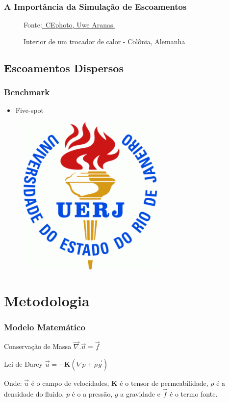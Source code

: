 \documentclass{beamer}
\newcommand{\figcopyright}[4]
{
  \begin{figure}
    \stackunder{
      \texttt{[image: \#1]}
    } {\raggedleft \tiny Fonte:\href{#2}{\textcopyright \ #3.}}
    \caption{#4}
  \end{figure}
}
\begin{document}
\begin{frame}
  \frametitle{A Importância da Simulação de Escoamentos}
  \figcopyright{figure/Cologne_Germany_Bundle-extractor-01.jpg}
	       {https://commons.wikimedia.org/wiki/File:Cologne_Germany_Bundle-extractor-01.jpg}
	       {CEphoto, Uwe Aranas}
	       {Interior de um trocador de calor - Colônia, Alemanha}
\end{frame}

\subsection{Escoamentos Dispersos}
\begin{frame}
\frametitle{Benchmark}
\begin{itemize}
 \item Five-spot
\end{itemize}
\begin{figure}
\includegraphics[height=0.550\linewidth]{figure/UERJ.png}
\end{figure}
\end{frame}

\section{Metodologia}
\begin{frame}
 \frametitle{Modelo Matemático}
\begin{block}{Conservação de Massa}
\centering
$\vec{\nabla}.\vec{u}=\vec{f}$
\end{block}

\begin{block}{Lei de Darcy}
\centering
$\vec{u} = -\mathbf{K} (\nabla p+\rho \vec{g})$
\end{block}

 Onde: $\vec{u}$ é o campo de velocidades, $\mathbf{K}$ é o tensor de permeabilidade, $\rho$ é a densidade do fluido, 
 $p$ é o a pressão, $g$ a gravidade e $\vec{f}$ é o termo fonte.
\end{frame}
\end{document}
